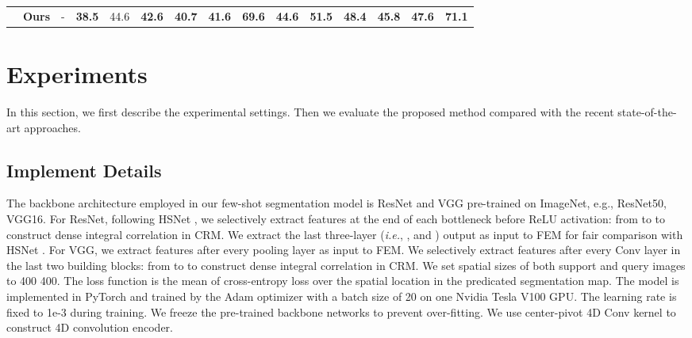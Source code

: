 \documentclass[journal]{IEEEtran}
\def\ie{\emph{i.e.}}
\begin{document}
\begin{table*}[t]
\begin{center}
\begin{tabular}{c|lc|cccccc|cccccc}
\cline{2-15}
 & \textbf{Ours}  & - & \textbf{38.5} & 44.6 & \textbf{42.6} & \textbf{40.7} & \textbf{41.6} & \textbf{69.6}   & \textbf{44.6} & \textbf{51.5} & \textbf{48.4}  & \textbf{45.8} & \textbf{47.6} & \textbf{71.1}  \\ \cline{1-15} 
\end{tabular}
\end{center}
\end{table*}

\section{Experiments}
\label{experiments}

In this section, we first describe the experimental settings. Then we evaluate the proposed method compared with the recent state-of-the-art approaches.  \par

\subsection{Implement Details}
The backbone architecture employed in our few-shot segmentation model is ResNet \cite{he2016deep} and VGG \cite{he2016deep} pre-trained on ImageNet, e.g., ResNet50, VGG16. For ResNet, following HSNet \cite{min2021hypercorrelation}, we selectively extract features at the end of each bottleneck before ReLU activation: from  to  to construct dense integral correlation in CRM. We extract the last three-layer (\ie, ,  and ) output as input to FEM for fair comparison with HSNet \cite{min2021hypercorrelation}. For VGG, we extract features after every pooling layer as input to FEM. We selectively extract features after every Conv layer in the last two building blocks: from  to  to construct dense integral correlation in CRM. We set spatial sizes of both support and query images to 400  400. The loss function is the mean of cross-entropy loss over the spatial location in the predicated segmentation map. The model is implemented in PyTorch \cite{paszke2019pytorch} and trained by the Adam optimizer with a batch size of 20 on one Nvidia Tesla V100 GPU. The learning rate is fixed to 1e-3 during training. We freeze the pre-trained backbone networks to prevent over-fitting. We use center-pivot 4D Conv kernel \cite{min2021hypercorrelation} to construct 4D convolution encoder.
\end{document}
